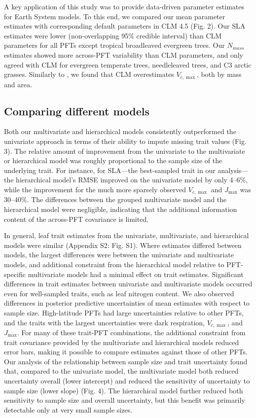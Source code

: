 \documentclass{article}
\begin{document}
A key application of this study was to provide data-driven parameter estimates for Earth System models.
To this end, we compared our mean parameter estimates with corresponding default parameters in CLM 4.5 \citep{clm45_note} (Fig. 2).
Our SLA estimates were lower (non-overlapping 95\% credible interval) than CLM parameters for all PFTs except tropical broadleaved evergreen trees.
Our $N_{mass}$ estimates showed more across-PFT variability than CLM parameters, and only agreed with CLM for evergreen temperate trees, needleleaved trees, and C3 arctic grasses.
Similarly to \citet{kattge_2009_quantifying}, we found that CLM overestimates $V_{c,\max}$, both by mass and area.

\subsection{Comparing different models}

Both our multivariate and hierarchical models consistently outperformed the univariate approach in terms of their ability to impute missing trait values (Fig. 3).
The relative amount of improvement from the univariate to the multivariate or hierarchical model was roughly proportional to the sample size of the underlying trait.
For instance, for SLA---the best-sampled trait in our analysis---the hierarchical model's RMSE improved on the univariate model by only 4--6\%,
while the improvement for the much more sparsely observed $V_{c,\max}$ and $J_{\max}$ was 30--40\%.
The differences between the grouped multivariate model and the hierarchical model were negligible,
indicating that the additional information content of the across-PFT covariance is limited.

In general, leaf trait estimates from the univariate, multivariate, and hierarchical models were similar (Appendix S2: Fig. S1).
Where estimates differed between models, the largest differences were between the univariate and multivariate models, and additional constraint from the hierarchical model relative to PFT-specific multivariate models had a minimal effect on trait estimates.
Significant differences in trait estimates between univariate and multivariate models occurred even for well-sampled traits, such as leaf nitrogen content.
We also observed differences in posterior predictive uncertainties of mean estimates with respect to sample size.
High-latitude PFTs had large uncertainties relative to other PFTs, and the traits with the largest uncertainties were dark respiration, $V_{c,\max}$, and $J_{\max}$.
For many of these trait-PFT combinations, the additional constraint from trait covariance provided by the multivariate and hierarchical models reduced error bars, making it possible to compare estimates against those of other PFTs.
Our analysis of the relationship between sample size and trait uncertainty found that, compared to the univariate model, the multivariate model both reduced uncertainty overall (lower intercept) and reduced the sensitivity of uncertainty to sample size (lower slope) (Fig. 4).
The hierarchical model further reduced both sensitivity to sample size and overall uncertainty, but this benefit was primarily detectable only at very small sample sizes.
\end{document}
